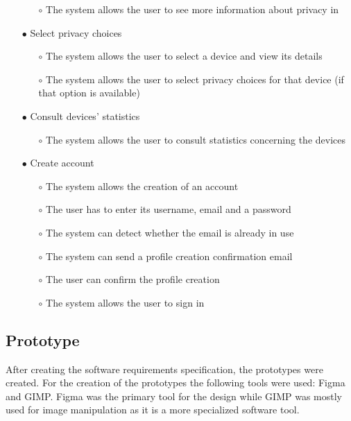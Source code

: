 \begin{itemize}
\begin{itemize}
        \item[$\circ$] The system allows the user to see more information about privacy in \hyperlink{\acronym}{\acronym}
    \end{itemize}
    \item[$\bullet$] Select privacy choices
    \begin{itemize}
        \item[$\circ$] The system allows the user to select a device and view its details
        \item[$\circ$] The system allows the user to select privacy choices for that device (if that option is available)
    \end{itemize}
    \item[$\bullet$] Consult devices' statistics
    \begin{itemize}
        \item[$\circ$] The system allows the user to consult statistics concerning the devices
    \end{itemize}
    \item[$\bullet$] Create account
    \begin{itemize}
        \item[$\circ$] The system allows the creation of an account
        \item[$\circ$] The user has to enter its username, email and a password
        \item[$\circ$] The system can detect whether the email is already in use
        \item[$\circ$] The system can send a profile creation confirmation email
        \item[$\circ$] The user can confirm the profile creation
        \item[$\circ$] The system allows the user to sign in
    \end{itemize}
\end{itemize}

\subsection{Prototype}

After creating the software requirements specification, the prototypes were
created. For the creation of the prototypes the following tools were used: Figma
and GIMP. Figma was the primary tool for the design while GIMP was mostly used
for image manipulation as it is a more specialized software tool.

